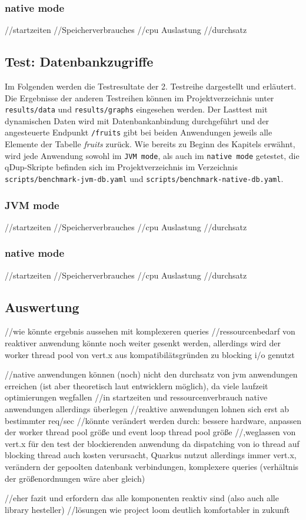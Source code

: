 \subsubsection{native mode}
//startzeiten
//Speicherverbrauches
//cpu Auslastung
//durchsatz
\subsection{Test: Datenbankzugriffe}
\label{section:datenbankzugriffe}
Im Folgenden werden die Testresultate der 2. Testreihe dargestellt und erläutert.
Die Ergebnisse der anderen Testreihen können im Projektverzeichnis unter \verb|results/data| und \verb|results/graphs| eingesehen werden.
Der Lasttest mit dynamischen Daten wird mit Datenbankanbindung durchgeführt und der angesteuerte Endpunkt \verb|/fruits| gibt bei beiden Anwendungen
jeweils alle Elemente der Tabelle \textit{fruits} zurück. Wie bereits zu Beginn des Kapitels erwähnt, wird jede Anwendung sowohl im \verb|JVM mode|, als auch im
\verb|native mode| getestet, die qDup-Skripte befinden sich im Projektverzeichnis im Verzeichnis \verb|scripts/benchmark-jvm-db.yaml| und
\verb|scripts/benchmark-native-db.yaml|.

\subsubsection{JVM mode}
//startzeiten
//Speicherverbrauches
//cpu Auslastung
//durchsatz
\subsubsection{native mode}
//startzeiten
//Speicherverbrauches
//cpu Auslastung
//durchsatz

\subsection{Auswertung}
//wie könnte ergebnis aussehen mit komplexeren queries
//ressourcenbedarf von reaktiver anwendung könnte noch weiter gesenkt werden, allerdings wird der worker thread pool von vert.x aus
kompatibilätsgründen zu blocking i/o genutzt

//native anwendungen können (noch) nicht den durchsatz von jvm anwendungen erreichen (ist aber theoretisch laut entwicklern möglich), da
viele laufzeit optimierungen wegfallen
//in startzeiten und ressourcenverbrauch native anwendungen allerdings überlegen
//reaktive anwendungen lohnen sich erst ab bestimmter req/sec
//könnte verändert werden durch: bessere hardware, anpassen der worker thread pool größe und event loop thread pool größe
//,weglassen von vert.x für den test der blockierenden anwendung da dispatching von io thread auf blocking thread auch kosten verursacht, Quarkus
nutzut allerdings immer vert.x, verändern der gepoolten datenbank verbindungen, komplexere queries (verhältnis der größenordnungen wäre aber gleich)


//eher fazit
und erfordern das alle komponenten reaktiv sind (also auch alle library hesteller)
//lösungen wie project loom deutlich komfortabler in  zukunft
\label{section:auswertung}